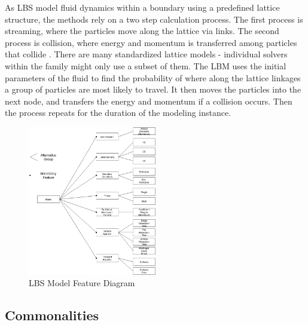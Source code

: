 \documentclass[12pt, notitlepage]{article}
\begin{document}
As LBS model fluid dynamics within a boundary using a predefined lattice structure, the methods rely on a two step calculation process. The first process is streaming, where the particles move along the lattice via links. The second process is collision, where energy and momentum is transferred among particles that collide \citep{bao2011lattice}.
There are many standardized lattice models - individual solvers within the family might only use a subset of them.
The LBM uses the initial parameters of the fluid to find the probability of where along the lattice linkages a group of particles are most likely to travel. It then moves the particles into the next node, and transfers the energy and momentum if a collision occurs. Then the process repeats for the duration of the modeling instance.

\begin{figure}[h!]
	\begin{center}
		\includegraphics[width=0.5\textwidth]{FeatureDiagramLBS}
		\caption{LBS Model Feature Diagram}
		\label{LBSFeatureDiagram}
	\end{center}
\end{figure} 

\subsection{Commonalities}\label{comm_sec}
\end{document}
